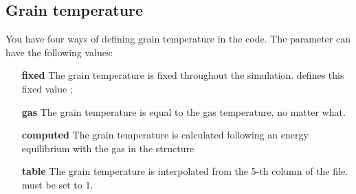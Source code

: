 \documentclass[english,a4paper,twoside]{article}
\begin{document}
\subsection{Grain temperature}\label{sec:dust_temp}
You have four ways of defining grain temperature in the code. The parameter  can have the following values:
\begin{itemize}
\item[\textbf{fixed}] The grain temperature is fixed throughout the simulation.  defines this fixed value ;
\item[\textbf{gas}] The grain temperature is equal to the gas temperature, no matter what.
\item[\textbf{computed}] The grain temperature is calculated following an energy equilibrium with the gas in the structure
\item[\textbf{table}] The grain temperature is interpolated from the 5-th column of the   file.  must be set to $1$.
\end{itemize}
\end{document}
